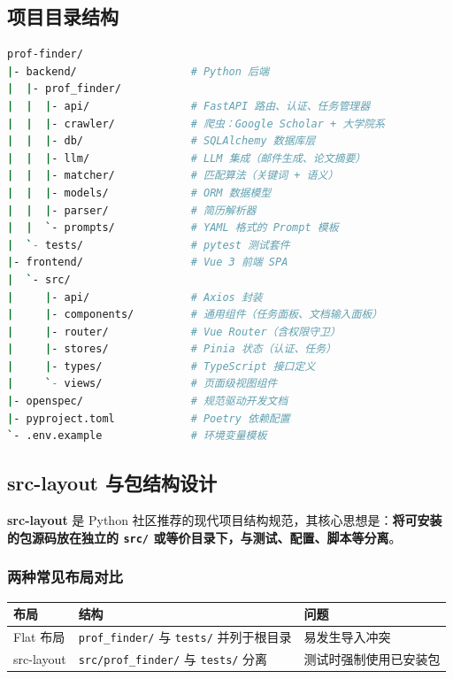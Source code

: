\documentclass[11pt]{article}
\begin{document}
\subsection{项目目录结构}

\begin{lstlisting}[language=bash, caption=项目根目录结构]
prof-finder/
|- backend/                  # Python 后端
|  |- prof_finder/
|  |  |- api/                # FastAPI 路由、认证、任务管理器
|  |  |- crawler/            # 爬虫：Google Scholar + 大学院系
|  |  |- db/                 # SQLAlchemy 数据库层
|  |  |- llm/                # LLM 集成（邮件生成、论文摘要）
|  |  |- matcher/            # 匹配算法（关键词 + 语义）
|  |  |- models/             # ORM 数据模型
|  |  |- parser/             # 简历解析器
|  |  `- prompts/            # YAML 格式的 Prompt 模板
|  `- tests/                 # pytest 测试套件
|- frontend/                 # Vue 3 前端 SPA
|  `- src/
|     |- api/                # Axios 封装
|     |- components/         # 通用组件（任务面板、文档输入面板）
|     |- router/             # Vue Router（含权限守卫）
|     |- stores/             # Pinia 状态（认证、任务）
|     |- types/              # TypeScript 接口定义
|     `- views/              # 页面级视图组件
|- openspec/                 # 规范驱动开发文档
|- pyproject.toml            # Poetry 依赖配置
`- .env.example              # 环境变量模板
\end{lstlisting}

\subsection{src-layout 与包结构设计}

\textbf{src-layout} 是 Python 社区推荐的现代项目结构规范，其核心思想是：\textbf{将可安装的包源码放在独立的 \texttt{src/} 或等价目录下，与测试、配置、脚本等分离}。

\subsubsection{两种常见布局对比}

\begin{center}
\begin{tabular}{|l|l|l|}
\hline
\textbf{布局} & \textbf{结构} & \textbf{问题} \\
\hline
Flat 布局 & \texttt{prof\_finder/} 与 \texttt{tests/} 并列于根目录 & 易发生导入冲突 \\
\hline
src-layout & \texttt{src/prof\_finder/} 与 \texttt{tests/} 分离 & 测试时强制使用已安装包 \\
\hline
\end{tabular}
\end{center}
\end{document}
